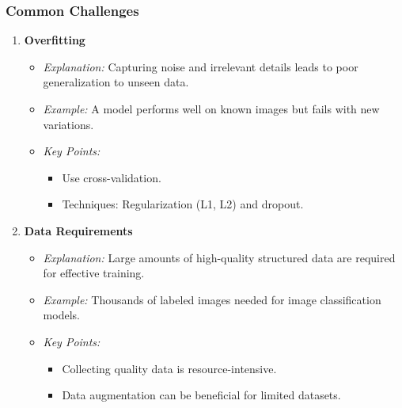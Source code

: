 \documentclass[aspectratio=169]{beamer}
\begin{document}
\begin{frame}[fragile]
    \frametitle{Common Challenges}
    \begin{enumerate}
        \item \textbf{Overfitting}
            \begin{itemize}
                \item \textit{Explanation:} Capturing noise and irrelevant details leads to poor generalization to unseen data.
                \item \textit{Example:} A model performs well on known images but fails with new variations.
                \item \textit{Key Points:} 
                    \begin{itemize}
                        \item Use cross-validation.
                        \item Techniques: Regularization (L1, L2) and dropout.
                    \end{itemize}
            \end{itemize}
        \item \textbf{Data Requirements}
            \begin{itemize}
                \item \textit{Explanation:} Large amounts of high-quality structured data are required for effective training.
                \item \textit{Example:} Thousands of labeled images needed for image classification models.
                \item \textit{Key Points:} 
                    \begin{itemize}
                        \item Collecting quality data is resource-intensive.
                        \item Data augmentation can be beneficial for limited datasets.
                    \end{itemize}
            \end{itemize}
    \end{enumerate}
\end{frame}
\end{document}
